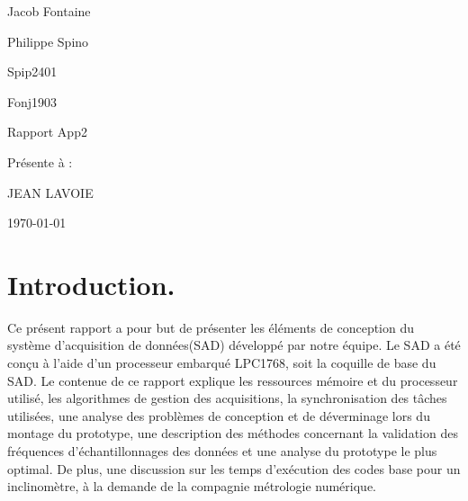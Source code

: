 \documentclass[12pt]{article}
\begin{document}
\begin{titlepage}
	\centering
	{\LARGE Jacob Fontaine \par
	 \LARGE Philippe Spino \par}
	\vspace{1cm}
	\small Spip2401\par
	\small Fonj1903\par 
	\vspace{3cm}
	{\Large Rapport App2\par}
	\vspace{5cm}
	{\Large Présente à :\par JEAN LAVOIE\par}
	\vspace{4cm}
	\vfill
	{\large \today\par}
\end{titlepage}
\newpage
\tableofcontents
{}
\newpage
{}
\setcounter{page}{1}
\onehalfspacing
\setlength{\parskip}{1em}
\section{Introduction.}
Ce présent rapport a pour but de présenter les éléments de conception du système d'acquisition de données(SAD) développé par notre équipe. Le SAD a été conçu à l'aide d'un processeur embarqué LPC1768, soit la coquille de base du SAD. Le contenue de ce rapport explique les ressources mémoire et du processeur utilisé, les algorithmes de gestion des acquisitions, la synchronisation des tâches utilisées, une analyse des problèmes de conception et de déverminage lors du montage du prototype, une description des méthodes concernant la validation des fréquences d'échantillonnages des données et une analyse du prototype le plus optimal. De plus, une discussion sur les temps d'exécution des codes base pour un inclinomètre, à la demande de la compagnie métrologie numérique.
\end{document}
